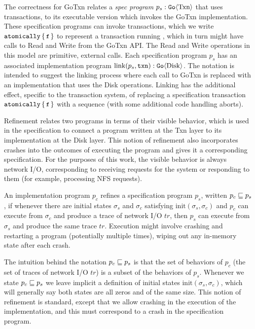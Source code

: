 The correctness for GoTxn relates a \emph{spec program}
$p_{s} : \mathtt{Go}\langle \mathrm{Txn} \rangle$ that uses transactions, to its executable version
which invokes the GoTxn implementation. These specification programs can invoke
transactions, which we write $\atomically{\cc{f}}$ to represent a transaction
running , which in turn might have calls to Read and Write from the GoTxn
API. The Read and Write operations in this model are primitive, external calls.
Each specification program $p_{s}$ has an associated implementation program
$\mathrm{link}(p_{s}, \texttt{txn}) : \mathtt{Go}\langle \mathrm{Disk} \rangle$. The notation is intended
to suggest the linking process where each call to GoTxn is replaced with an
implementation that uses the Disk operations. Linking has the additional effect,
specific to the transaction system, of replacing a specification
transaction $\atomically{\cc{f}}$ with a sequence 
(with some additional code handling aborts).


Refinement relates two programs in terms of their visible behavior, which is
used in the specification
to connect a program written at the Txn layer to its
implementation at the Disk layer. This notion of refinement also incorporates
crashes into the outcomes of executing the program and gives it a corresponding specification.
For the purposes of this work, the visible
behavior is always network I/O, corresponding to receiving requests for the
system or responding to them (for example, processing NFS requests).

\begin{definition}[Refinement]
  An implementation program $p_{c}$ refines a specification program $p_{s}$,
written $p_{c} \sqsubseteq p_{s}$, if whenever there are initial states
$\sigma_{s}$ and $\sigma_{c}$ satisfying $\mathrm{init}(\sigma_{s}, \sigma_{c})$
and $p_{c}$ can execute from $\sigma_{c}$ and produce a trace of network I/O
$\textit{tr}$, then $p_{s}$ can execute from $\sigma_{s}$ and produce the same trace
$\textit{tr}$.  Execution might involve crashing and restarting a program (potentially
multiple times), wiping out any in-memory state after each crash.
  \label{def:refinement}
\end{definition}

The intuition behind the notation $p_{c} \sqsubseteq p_{s}$ is that the set of
behaviors of $p_{c}$ (the set of traces of network I/O $\textit{tr}$) is a subset of the
behaviors of $p_{s}$. Whenever we state $p_{c} \sqsubseteq p_{s}$ we leave implicit
a definition of initial states $\mathrm{init}(\sigma_{s}, \sigma_{c})$, which
will generally say both states are all zeros and of the same size. This notion
of refinement is standard, except that we allow crashing in the execution of the
implementation, and this must correspond to a crash in the specification
program.

